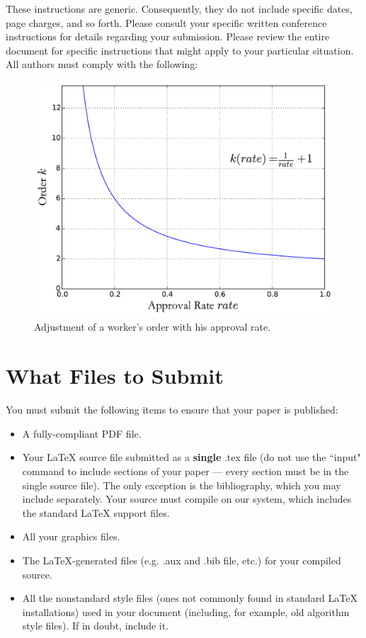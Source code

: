 \documentclass[letterpaper]{article}
\theoremstyle{definition}
\begin{document}
These instructions are generic. Consequently, they do not include specific dates, page charges, and so forth. Please consult your specific written conference instructions for details regarding your submission. Please review the entire document for specific instructions that might apply to your particular situation. All authors must comply with the following:
\begin{figure}[!ht]
   \centering
   \begin{center}
     \includegraphics*[width=0.8\linewidth]{rate_order}
   \caption{Adjustment of a worker's order with his approval rate.}
   \label{fig:rate2order}
   \end{center}
\end{figure}





\section{What Files to Submit}
You must submit the following items to ensure that your paper is published:
\begin{itemize}
\item A fully-compliant PDF file.
\item Your  \LaTeX{}  source file submitted as a \textbf{single} .tex file (do not use the ``input" command to include sections of your paper --- every section must be in the single source file). The only exception is the bibliography, which you may include separately. Your source must compile on our system, which includes the standard \LaTeX{} support files.
\item All your graphics files.
\item The \LaTeX{}-generated files (e.g. .aux and .bib file, etc.) for your compiled source.
\item All the nonstandard style files (ones not commonly found in standard \LaTeX{} installations) used in your document (including, for example, old algorithm style files). If in doubt, include it.
\end{itemize}
\end{document}
